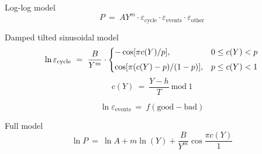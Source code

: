 Log-log model
\begin{equation}
    P
    \ =\ AY^m \cdot \varepsilon_\text{cycle}\cdot \varepsilon_\text{events}\cdot \varepsilon_\text{other}
\end{equation}

Damped tilted sinusoidal model
\begin{equation}
    \ln{\varepsilon_\text{cycle}}
    \ =\
    \frac{B}{Y^m}\cdot
    \left\{
    \begin{matrix}
        -\cos[\pi c(Y)/p],\hfill & 0\leq c(Y) < p\hfill
        \\[6pt]
        \cos[\pi(c(Y) - p)/(1-p)],\hfill & p\leq c(Y) <1\hfill
    \end{matrix}
    \right.
\end{equation}
\begin{equation*}
    c(Y)
    \ =\
    \frac{Y-h}{T}\ \mathrm{mod}\ 1
\end{equation*}

\begin{equation}
    \ln{\varepsilon_\text{events}}
    \ =\ f(\text{good} - \text{bad})
\end{equation}

Full model
\begin{equation}
    \ln{P}
    \ =\ \ln{A} + m\ln(Y) + \frac{B}{Y^m}\cos\frac{\pi c(Y)}{1}
\end{equation}
